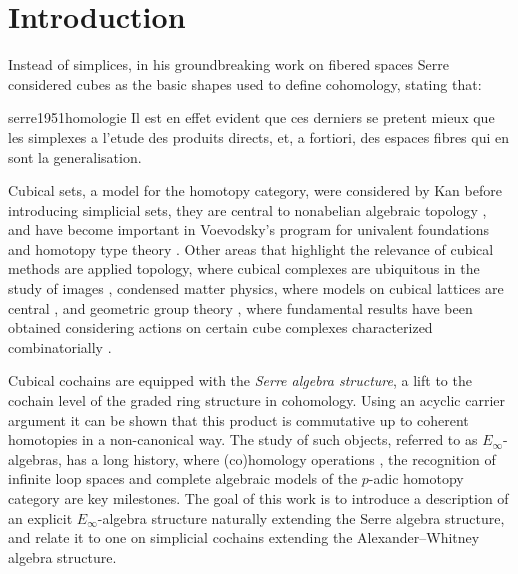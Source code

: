 
\section{Introduction} \label{s:introduction}

Instead of simplices, in his groundbreaking work on fibered spaces Serre considered cubes as the basic shapes used to define cohomology, stating that:
\begin{displaycquote}[p.431]{serre1951homologie}
	Il est en effet evident que ces derniers se pretent mieux que les simplexes a l'etude des produits directs, et, a fortiori, des espaces fibres qui en sont la generalisation.
\end{displaycquote}
Cubical sets, a model for the homotopy category, were considered by Kan \cite{kan1955abstract, kan1956abstract} before introducing simplicial sets, they are central to nonabelian algebraic topology \cite{brown2011nonabelian}, and have become important in Voevodsky's program for univalent foundations and homotopy type theory \cite{kapulkin2020straightening, mortberg2017cubical}.
Other areas that highlight the relevance of cubical methods are applied topology, where cubical complexes are ubiquitous in the study of images \cite{tomasz2004computational}, condensed matter physics, where models on cubical lattices are central \cite{baxter1985exactlysolved}, and geometric group theory \cite{gromov1987hyperbolic}, where fundamental results have been obtained considering actions on certain cube complexes characterized combinatorially \cite{agol2013haken}.

Cubical cochains are equipped with the \textit{Serre algebra structure}, a lift to the cochain level of the graded ring structure in cohomology.
Using an acyclic carrier argument it can be shown that this product is commutative up to coherent homotopies in a non-canonical way.
The study of such objects, referred to as $E_\infty$-algebras, has a long history, where (co)homology operations \cite{steenrod1962cohomology, may1970general}, the recognition of infinite loop spaces \cite{boardman1973homotopy, may1972geometry} and complete algebraic models of the $p$-adic homotopy category \cite{mandell2001padic} are key milestones.
The goal of this work is to introduce a description of an explicit $E_\infty$-algebra structure naturally extending the Serre algebra structure, and relate it to one on simplicial cochains extending the Alexander--Whitney algebra structure.

